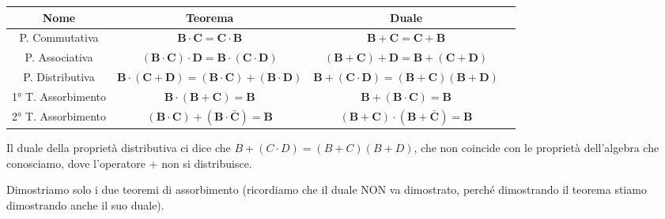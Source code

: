 \documentclass[11pt, a4paper, titlepage, oneside]{scrbook}
\begin{document}
\begin{Proprieta}
\label{prop-teoremi-piu-variabili}
\begin{center}
\begin{tabular}{|c|c|c|c|}
    \hline
    \textbf{Nome} & \textbf{Teorema} & \textbf{Duale} \\
    \hline
    P. Commutativa & $\bm{B \cdot C = C \cdot B}$ & $\bm{B + C = C + B}$ \\
    \hline
    P. Associativa & $\bm{(B \cdot C) \cdot D = B \cdot (C \cdot D)}$ & $\bm{(B + C) + D = B + (C + D)}$ \\
    \hline
    P. Distributiva & $\bm{B \cdot (C + D) = (B \cdot C) + (B \cdot D)}$ & $\bm{B + (C \cdot D) = (B + C) (B + D)}$ \\
    \hline
    1° T. Assorbimento & $\bm{B \cdot (B + C) = B}$ & $\bm{B + (B \cdot C) = B}$ \\
    \hline
    2° T. Assorbimento & $\bm{(B \cdot C) + (B \cdot \bar{C}) = B}$ & $\bm{(B + C) \cdot (B + \bar{C}) = B}$ \\
    \hline
\end{tabular}
\end{center}
\NB Il duale della proprietà distributiva ci dice che $B + (C \cdot D) = (B + C)(B + D)$, che non coincide con le proprietà dell'algebra che conosciamo, dove l'operatore + non si distribuisce.
\end{Proprieta}

\Dimostrazione \nopagebreak

Dimostriamo solo i due teoremi di assorbimento (ricordiamo che il duale NON va dimostrato, perché dimostrando il teorema stiamo dimostrando anche il suo duale).
\end{document}
